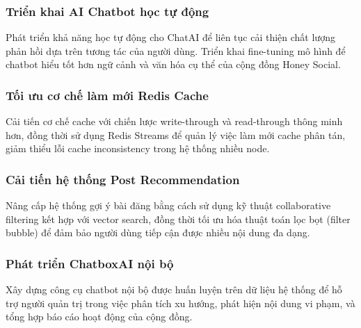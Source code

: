 \subsubsection{Triển khai AI Chatbot học tự động}
Phát triển khả năng học tự động cho ChatAI để liên tục cải thiện chất lượng phản hồi dựa trên tương tác của người dùng. Triển khai fine-tuning mô hình để chatbot hiểu tốt hơn ngữ cảnh và văn hóa cụ thể của cộng đồng Honey Social.

\subsubsection{Tối ưu cơ chế làm mới Redis Cache}
Cải tiến cơ chế cache với chiến lược write-through và read-through thông minh hơn, đồng thời sử dụng Redis Streams để quản lý việc làm mới cache phân tán, giảm thiểu lỗi cache inconsistency trong hệ thống nhiều node.

\subsubsection{Cải tiến hệ thống Post Recommendation}
Nâng cấp hệ thống gợi ý bài đăng bằng cách sử dụng kỹ thuật collaborative filtering kết hợp với vector search, đồng thời tối ưu hóa thuật toán lọc bọt (filter bubble) để đảm bảo người dùng tiếp cận được nhiều nội dung đa dạng.

\subsubsection{Phát triển ChatboxAI nội bộ}
Xây dựng công cụ chatbot nội bộ được huấn luyện trên dữ liệu hệ thống để hỗ trợ người quản trị trong việc phân tích xu hướng, phát hiện nội dung vi phạm, và tổng hợp báo cáo hoạt động của cộng đồng.